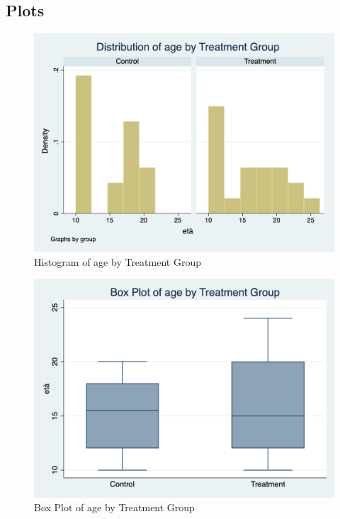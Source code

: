 \documentclass{article}
\begin{document}
\subsection{Plots}

\begin{figure}[h]
\centering
\includegraphics[scale=0.30]{histogram_eta_ntrad.png}
\caption{Histogram of age by Treatment Group}
\end{figure}

\begin{figure}[h]
\centering
\includegraphics[scale=0.30]{box_plot_eta_ntrad.png}
\caption{Box Plot of age by Treatment Group}
\end{figure}
\end{document}
